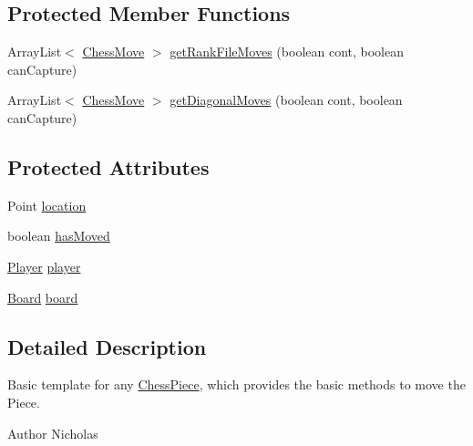 \subsection*{Protected Member Functions}
\begin{DoxyCompactItemize}
\item 
Array\-List$<$ \hyperlink{classmodel_1_1_chess_move}{Chess\-Move} $>$ \hyperlink{classmodel_1_1_chess_piece_ae17e31878bc8896a3dc576c62898c993}{get\-Rank\-File\-Moves} (boolean cont, boolean can\-Capture)
\item 
Array\-List$<$ \hyperlink{classmodel_1_1_chess_move}{Chess\-Move} $>$ \hyperlink{classmodel_1_1_chess_piece_ab8916510321ef5b697b4cd3dd1c7da80}{get\-Diagonal\-Moves} (boolean cont, boolean can\-Capture)
\end{DoxyCompactItemize}
\subsection*{Protected Attributes}
\begin{DoxyCompactItemize}
\item 
Point \hyperlink{classmodel_1_1_chess_piece_a7fc68849278fd30e4c238e8e40d6be8b}{location}
\item 
boolean \hyperlink{classmodel_1_1_chess_piece_ab3cb2b4640d680527a76ee105d233107}{has\-Moved}
\item 
\hyperlink{classcontroller_1_1_player}{Player} \hyperlink{classmodel_1_1_chess_piece_a7c821434522ec5b3f84549ab7b49614f}{player}
\item 
\hyperlink{classmodel_1_1board_1_1_board}{Board} \hyperlink{classmodel_1_1_chess_piece_a41b428c5909b4d5bf0dab321be4cfa56}{board}
\end{DoxyCompactItemize}


\subsection{Detailed Description}
Basic template for any \hyperlink{classmodel_1_1_chess_piece}{Chess\-Piece}, which provides the basic methods to move the Piece.

\begin{DoxyAuthor}{Author}
Nicholas 
\end{DoxyAuthor}


